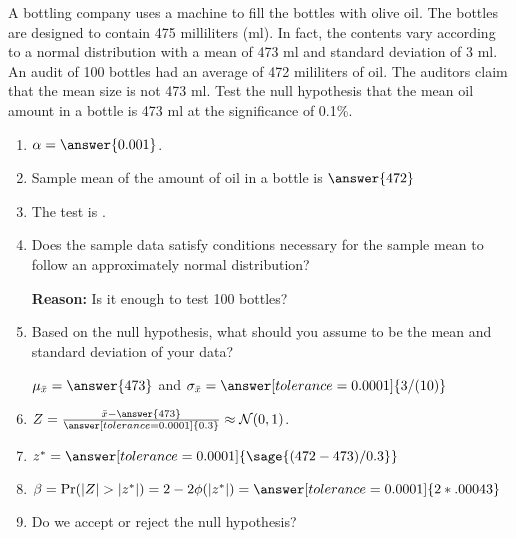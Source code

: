 \documentclass{ximera}
\begin{document}
\begin{problem}
A bottling company uses a machine to fill the bottles with olive oil. The bottles are designed
to contain 475 milliliters (ml). In fact, the contents vary according to a normal distribution with
a mean of 473 ml and standard deviation of 3 ml. An audit of 100 bottles had an average of 472 mililiters of oil. The auditors claim that the mean size is not 473 ml. Test the null hypothesis that the mean oil amount in a bottle is 473 ml at the significance of 0.1\%.

\begin{explanation}
\begin{enumerate}
    \item $\alpha=\answer{0.001}$.
    \item Sample mean of the amount of oil in a bottle is $\answer{472}$
     \item The test is .
    \item Does the sample data satisfy conditions necessary for the sample mean to follow an
approximately normal distribution?
\begin{multipleChoice}
\end{multipleChoice}
{\bf Reason:} Is it enough to test 100 bottles? 
    
    \item Based on the null hypothesis, what should you assume to be the mean and standard deviation of your data? 

$\mu_{\bar x}=\answer{473}$ and $\sigma_{\bar x}=\answer[tolerance=0.0001]{{3/(10)}}$
    \item $Z=\frac{\bar x -\answer{473}}{\answer[tolerance=0.0001]{0.3}}\approx \mathcal N(0,1)$.
    \item $z^*=\answer[tolerance=0.0001]{\sage{(472-473)/0.3}}$
    \item $\beta=\Pr(|Z|>|z^*|)=2-2\phi(|z^*|)=\answer[tolerance=0.0001]{2*.00043}$
    \item Do we accept or reject the null hypothesis?
    \begin{multipleChoice}
    \end{multipleChoice}
\end{enumerate}
\end{explanation}
\end{problem}
\end{document}
